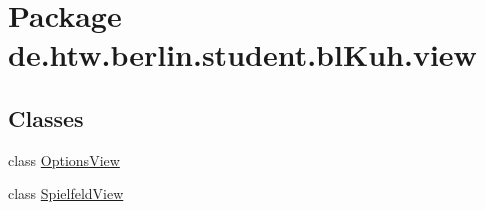 \hypertarget{namespacede_1_1htw_1_1berlin_1_1student_1_1bl_kuh_1_1view}{\section{Package de.\-htw.\-berlin.\-student.\-bl\-Kuh.\-view}
\label{namespacede_1_1htw_1_1berlin_1_1student_1_1bl_kuh_1_1view}
}
\subsection*{Classes}
\begin{DoxyCompactItemize}
\item 
class \hyperlink{classde_1_1htw_1_1berlin_1_1student_1_1bl_kuh_1_1view_1_1_options_view}{Options\-View}
\item 
class \hyperlink{classde_1_1htw_1_1berlin_1_1student_1_1bl_kuh_1_1view_1_1_spielfeld_view}{Spielfeld\-View}
\end{DoxyCompactItemize}

